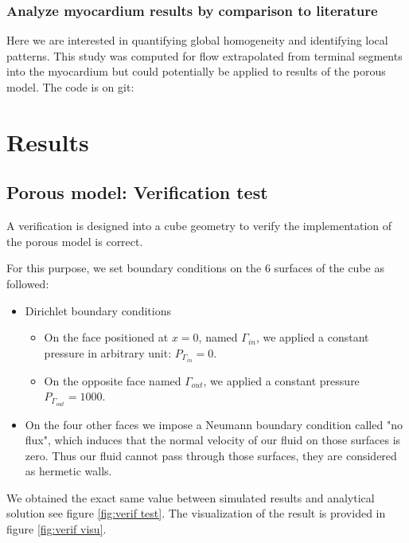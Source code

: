\documentclass[a4paper, 11pt]{article} %
\begin{document}
\subsubsection{Analyze myocardium results by comparison to literature}
Here we are interested in quantifying global homogeneity and identifying local patterns. This study was computed for flow extrapolated from terminal segments into the myocardium but could potentially be applied to results of the porous model.
The code is on git:  


\section{Results}\label{sec:results}

\subsection{Porous model: Verification test}

A verification is designed into a cube geometry to verify the implementation of the porous model is correct.

For this purpose, we set boundary conditions on the 6 surfaces of the cube as followed:
\begin{itemize}
\item Dirichlet boundary conditions
\begin{itemize}
\item On the face positioned at $x = 0$, named $\Gamma_{in}$, we applied a constant pressure in arbitrary unit: $P_{\Gamma_{in}} = 0$.
\item On the opposite face named $\Gamma_{out}$, we applied a constant pressure $P_{\Gamma_{out}} = 1000$.
\end{itemize}

\item On the four other faces we impose a Neumann boundary condition called "no flux", which induces that the normal velocity of our fluid on those surfaces is zero. Thus our fluid cannot pass through those surfaces, they are considered as hermetic walls.
\end{itemize} 


We obtained the exact same value between simulated results and analytical solution see figure \ref{fig:verif test}. The visualization of the result is provided in figure \ref{fig:verif visu}.
\end{document}
